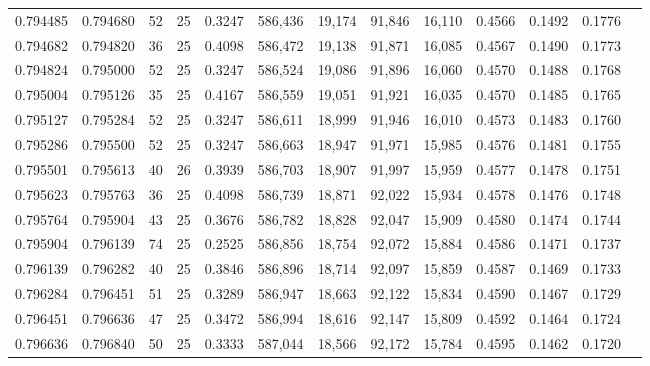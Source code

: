 \begin{tabular}{rrrrrrrrrrrrr}
0.794485 & 0.794680 &    52 &  25 &                                     0.3247 & 586,436 &  19,174 &  91,846 &  16,110 & 0.4566 & 0.1492 & 0.1776 \\
0.794682 & 0.794820 &    36 &  25 &                                     0.4098 & 586,472 &  19,138 &  91,871 &  16,085 & 0.4567 & 0.1490 & 0.1773 \\
0.794824 & 0.795000 &    52 &  25 &                                     0.3247 & 586,524 &  19,086 &  91,896 &  16,060 & 0.4570 & 0.1488 & 0.1768 \\
0.795004 & 0.795126 &    35 &  25 &                                     0.4167 & 586,559 &  19,051 &  91,921 &  16,035 & 0.4570 & 0.1485 & 0.1765 \\
0.795127 & 0.795284 &    52 &  25 &                                     0.3247 & 586,611 &  18,999 &  91,946 &  16,010 & 0.4573 & 0.1483 & 0.1760 \\
0.795286 & 0.795500 &    52 &  25 &                                     0.3247 & 586,663 &  18,947 &  91,971 &  15,985 & 0.4576 & 0.1481 & 0.1755 \\
0.795501 & 0.795613 &    40 &  26 &                                     0.3939 & 586,703 &  18,907 &  91,997 &  15,959 & 0.4577 & 0.1478 & 0.1751 \\
0.795623 & 0.795763 &    36 &  25 &                                     0.4098 & 586,739 &  18,871 &  92,022 &  15,934 & 0.4578 & 0.1476 & 0.1748 \\
0.795764 & 0.795904 &    43 &  25 &                                     0.3676 & 586,782 &  18,828 &  92,047 &  15,909 & 0.4580 & 0.1474 & 0.1744 \\
0.795904 & 0.796139 &    74 &  25 &                                     0.2525 & 586,856 &  18,754 &  92,072 &  15,884 & 0.4586 & 0.1471 & 0.1737 \\
0.796139 & 0.796282 &    40 &  25 &                                     0.3846 & 586,896 &  18,714 &  92,097 &  15,859 & 0.4587 & 0.1469 & 0.1733 \\
0.796284 & 0.796451 &    51 &  25 &                                     0.3289 & 586,947 &  18,663 &  92,122 &  15,834 & 0.4590 & 0.1467 & 0.1729 \\
0.796451 & 0.796636 &    47 &  25 &                                     0.3472 & 586,994 &  18,616 &  92,147 &  15,809 & 0.4592 & 0.1464 & 0.1724 \\
0.796636 & 0.796840 &    50 &  25 &                                     0.3333 & 587,044 &  18,566 &  92,172 &  15,784 & 0.4595 & 0.1462 & 0.1720 \\

\end{tabular}
